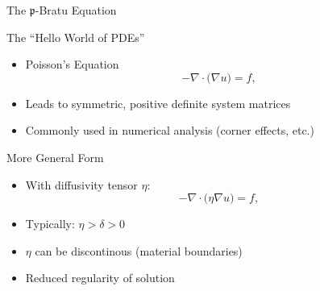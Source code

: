 



\begin{frame}{The $\mathfrak{p}$-Bratu Equation}

  \begin{block}{The ``Hello World of PDEs''}
  \begin{itemize}
   \item Poisson's Equation
    \begin{equation*}
      -\nabla \cdot \bigl(\nabla u \bigr) = f,
    \end{equation*}
   \item Leads to symmetric, positive definite system matrices
   \item Commonly used in numerical analysis (corner effects, etc.)
  \end{itemize}
  \end{block}

  \begin{block}{More General Form}
  \begin{itemize}
   \item With diffusivity tensor $\eta$:
    \begin{equation*}
      -\nabla \cdot \bigl( \eta \nabla u \bigr) = f,
    \end{equation*}
   \item Typically: $\eta > \delta > 0$
   \item $\eta$ can be discontinous (material boundaries)
   \item Reduced regularity of solution
  \end{itemize}
  \end{block}
  
\end{frame}



